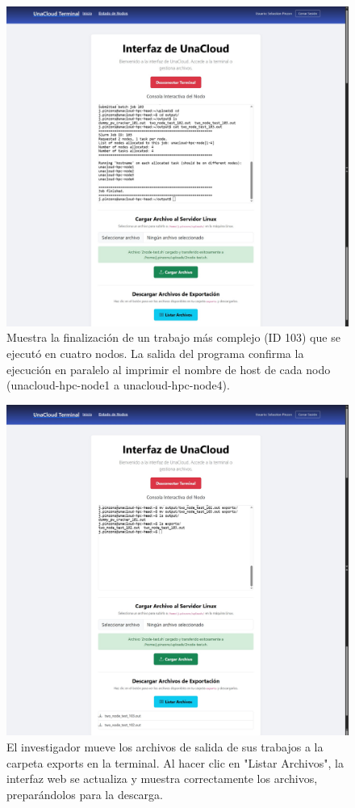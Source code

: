 \begin{figure}[H]
    \centering
    \includegraphics[width=0.75\linewidth]{Documento Final/Imagenes/TaskComplete2.jpg}
    \caption{Muestra la finalización de un trabajo más complejo (ID 103) que se ejecutó en cuatro nodos. La salida del programa confirma la ejecución en paralelo al imprimir el nombre de host de cada nodo (unacloud-hpc-node1 a unacloud-hpc-node4).}
    \label{fig:TaskComplete2}
\end{figure}

\begin{figure}[H]
    \centering
    \includegraphics[width=0.75\linewidth]{Documento Final/Imagenes/ExportResults.jpg}
    \caption{El investigador mueve los archivos de salida de sus trabajos a la carpeta exports en la terminal. Al hacer clic en "Listar Archivos", la interfaz web se actualiza y muestra correctamente los archivos, preparándolos para la descarga.}
    \label{fig:ExportResults}
\end{figure}

